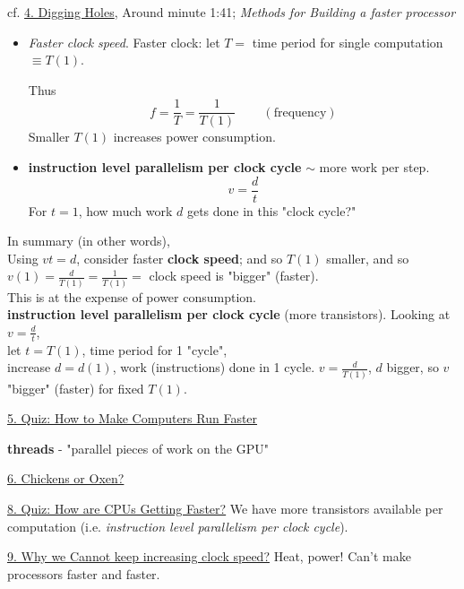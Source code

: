 \documentclass[10pt]{amsart}
\begin{document}
\begin{multicols*}{2}
cf. \href{https://classroom.udacity.com/courses/cs344/lessons/55120467/concepts/658883610923}{4. Digging Holes}, 
Around minute 1:41; \emph{Methods for Building a faster processor} 
\begin{itemize}
\item \emph{Faster clock speed}.  Faster clock: let $T =$ time period for single computation $\equiv T(1)$.  

Thus 
\[
f = \frac{1}{T} = \frac{1}{T(1)} \qquad \, (\text{frequency})
\]  
Smaller $T(1)$ increases power consumption.  
\item \textbf{instruction level parallelism per clock cycle} $\sim$ more work per step.  
\[
v = \frac{d}{t}
\]
For $t=1$, how much work $d$ gets done in this "clock cycle?"
\end{itemize}

In summary (in other words), \\

Using $vt=d$, consider faster \textbf{clock speed}; and so $T(1)$ smaller, and so $v(1) = \frac{d}{T(1)} = \frac{1}{ T(1)} = $ clock speed is "bigger" (faster).  \\

This is at the expense of power consumption.  \\

\textbf{instruction level parallelism per clock cycle} (more transistors).  Looking at $v=\frac{d}{t}$, \\

let $t=T(1)$, time period for 1 "cycle", \\

increase $d=d(1)$, work (instructions) done in 1 cycle.  $v=\frac{d}{T(1)}$, $d$ bigger, so $v$ "bigger" (faster) for fixed $T(1)$.  

\href{https://classroom.udacity.com/courses/cs344/lessons/55120467/concepts/659387650923}{5. Quiz: How to Make Computers Run Faster} 

\textbf{threads} - "parallel pieces of work on the GPU"

\href{https://classroom.udacity.com/courses/cs344/lessons/55120467/concepts/670611900923}{6. Chickens or Oxen?}

\href{https://classroom.udacity.com/courses/cs344/lessons/55120467/concepts/668222780923}{8. Quiz: How are CPUs Getting Faster?}  We have more transistors available per computation (i.e. \emph{instruction level parallelism per clock cycle}).  

\href{https://classroom.udacity.com/courses/cs344/lessons/55120467/concepts/670462960923}{9. Why we Cannot keep increasing clock speed?} Heat, power!  Can't make processors faster and faster.  


\end{multicols*}
\end{document}

